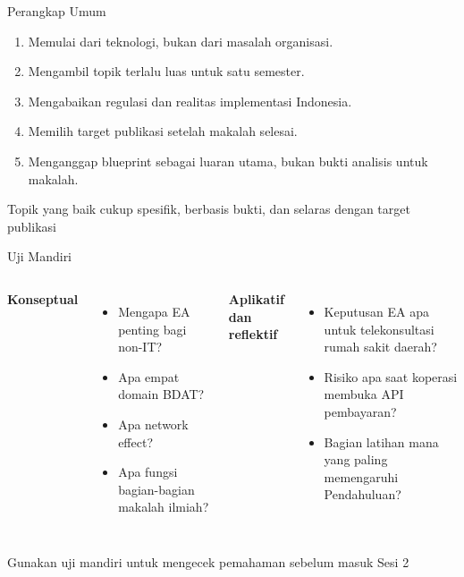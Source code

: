 \documentclass[aspectratio=169, table]{beamer}
\newcommand{\takeaway}[1]{%
  \vspace{4pt}
  {\footnotesize #1}
}
\begin{document}
\begin{frame}{Perangkap Umum}
  \vspace{8pt}
  \begin{enumerate}
    \item Memulai dari teknologi, bukan dari masalah organisasi.
    \item Mengambil topik terlalu luas untuk satu semester.
    \item Mengabaikan regulasi dan realitas implementasi Indonesia.
    \item Memilih target publikasi setelah makalah selesai.
    \item Menganggap blueprint sebagai luaran utama, bukan bukti analisis untuk makalah.
  \end{enumerate}

  \takeaway{Topik yang baik cukup spesifik, berbasis bukti, dan selaras dengan target publikasi}
\end{frame}

\begin{frame}{Uji Mandiri}
  \vspace{8pt}
  \begin{columns}[t]
    \textbf{Konseptual}
    \vspace{4pt}
    \begin{itemize}
      \item Mengapa EA penting bagi non-IT?
      \item Apa empat domain BDAT?
      \item Apa network effect?
      \item Apa fungsi bagian-bagian makalah ilmiah?
    \end{itemize}

    \textbf{Aplikatif dan reflektif}
    \vspace{4pt}
    \begin{itemize}
      \item Keputusan EA apa untuk telekonsultasi rumah sakit daerah?
      \item Risiko apa saat koperasi membuka API pembayaran?
      \item Bagian latihan mana yang paling memengaruhi Pendahuluan?
    \end{itemize}
  \end{columns}

  \takeaway{Gunakan uji mandiri untuk mengecek pemahaman sebelum masuk Sesi 2}
\end{frame}
\end{document}
